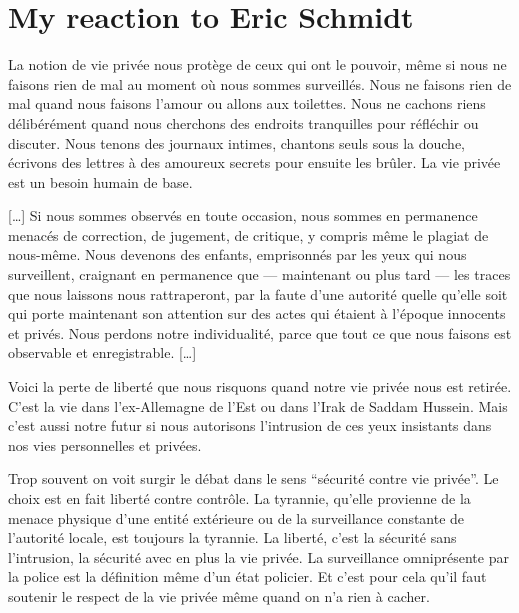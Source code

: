 \section{My reaction to Eric Schmidt}

La notion de vie privée nous protège de ceux qui ont le pouvoir, même si nous ne faisons rien de mal au moment où nous sommes surveillés. Nous ne faisons rien de mal quand nous faisons l'amour ou allons aux toilettes. Nous ne cachons riens délibérément quand nous cherchons des endroits tranquilles pour réfléchir ou discuter. Nous tenons des journaux intimes, chantons seuls sous la douche, écrivons des lettres à des amoureux secrets pour ensuite les brûler. La vie privée est un besoin humain de base.

[…] Si nous sommes observés en toute occasion, nous sommes en permanence menacés de correction, de jugement, de critique, y compris même le plagiat de nous-même. Nous devenons des enfants, emprisonnés par les yeux qui nous surveillent, craignant en permanence que --- maintenant ou plus tard --- les traces que nous laissons nous rattraperont, par la faute d'une autorité quelle qu'elle soit qui porte maintenant son attention sur des actes qui étaient à l'époque innocents et privés. Nous perdons notre individualité, parce que tout ce que nous faisons est observable et enregistrable. […]

Voici la perte de liberté que nous risquons quand notre vie privée nous est retirée. C'est la vie dans l'ex-Allemagne de l'Est ou dans l'Irak de Saddam Hussein. Mais c'est aussi notre futur si nous autorisons l'intrusion de ces yeux insistants dans nos vies personnelles et privées.

Trop souvent on voit surgir le débat dans le sens ``sécurité contre vie privée''. Le choix est en fait liberté contre contrôle. La tyrannie, qu'elle provienne de la menace physique d'une entité extérieure ou de la surveillance constante de l'autorité locale, est toujours la tyrannie. La liberté, c'est la sécurité sans l'intrusion, la sécurité avec en plus la vie privée. La surveillance omniprésente par la police est la définition même d'un état policier. Et c'est pour cela qu'il faut soutenir le respect de la vie privée même quand on n'a rien à cacher.
